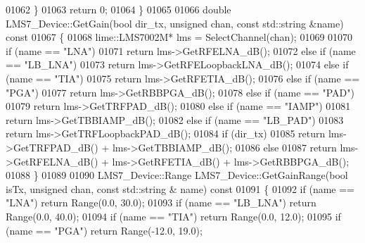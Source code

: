 \begin{DoxyCode}
{{{01062     \}
01063     \textcolor{keywordflow}{return} 0;
01064 \}
01065 
01066 \textcolor{keywordtype}{double} LMS7_Device::GetGain(\textcolor{keywordtype}{bool} dir_tx, \textcolor{keywordtype}{unsigned} chan, \textcolor{keyword}{const} std::string &name)\textcolor{keyword}{ const}
01067 \textcolor{keyword}{}\{
01068     lime::LMS7002M* lms = SelectChannel(chan);
01069 
01070     \textcolor{keywordflow}{if} (name == \textcolor{stringliteral}{"LNA"})
01071         \textcolor{keywordflow}{return} lms->GetRFELNA_dB();
01072     \textcolor{keywordflow}{else} \textcolor{keywordflow}{if} (name == \textcolor{stringliteral}{"LB\_LNA"})
01073         \textcolor{keywordflow}{return} lms->GetRFELoopbackLNA_dB();
01074     \textcolor{keywordflow}{else} \textcolor{keywordflow}{if} (name == \textcolor{stringliteral}{"TIA"})
01075         \textcolor{keywordflow}{return} lms->GetRFETIA_dB();
01076     \textcolor{keywordflow}{else} \textcolor{keywordflow}{if} (name == \textcolor{stringliteral}{"PGA"})
01077         \textcolor{keywordflow}{return} lms->GetRBBPGA_dB();
01078     \textcolor{keywordflow}{else} \textcolor{keywordflow}{if} (name == \textcolor{stringliteral}{"PAD"})
01079         \textcolor{keywordflow}{return} lms->GetTRFPAD_dB();
01080     \textcolor{keywordflow}{else} \textcolor{keywordflow}{if} (name == \textcolor{stringliteral}{"IAMP"})
01081         \textcolor{keywordflow}{return} lms->GetTBBIAMP_dB();
01082     \textcolor{keywordflow}{else} \textcolor{keywordflow}{if} (name == \textcolor{stringliteral}{"LB\_PAD"})
01083         \textcolor{keywordflow}{return} lms->GetTRFLoopbackPAD_dB();
01084     \textcolor{keywordflow}{if} (dir\_tx)
01085         \textcolor{keywordflow}{return} lms->GetTRFPAD_dB() + lms->GetTBBIAMP_dB();
01086     \textcolor{keywordflow}{else}
01087         \textcolor{keywordflow}{return} lms->GetRFELNA_dB() + lms->GetRFETIA_dB() + lms->GetRBBPGA_dB();
01088 \}
01089 
01090 LMS7_Device::Range LMS7_Device::GetGainRange(\textcolor{keywordtype}{bool} isTx, \textcolor{keywordtype}{unsigned} chan, \textcolor{keyword}{const} std::string &
      name)\textcolor{keyword}{ const}
01091 \textcolor{keyword}{}\{
01092     \textcolor{keywordflow}{if} (name == \textcolor{stringliteral}{"LNA"}) \textcolor{keywordflow}{return} Range(0.0, 30.0);
01093     \textcolor{keywordflow}{if} (name == \textcolor{stringliteral}{"LB\_LNA"}) \textcolor{keywordflow}{return} Range(0.0, 40.0);
01094     \textcolor{keywordflow}{if} (name == \textcolor{stringliteral}{"TIA"}) \textcolor{keywordflow}{return} Range(0.0, 12.0);
01095     \textcolor{keywordflow}{if} (name == \textcolor{stringliteral}{"PGA"}) \textcolor{keywordflow}{return} Range(-12.0, 19.0);
}}}
\end{DoxyCode}
